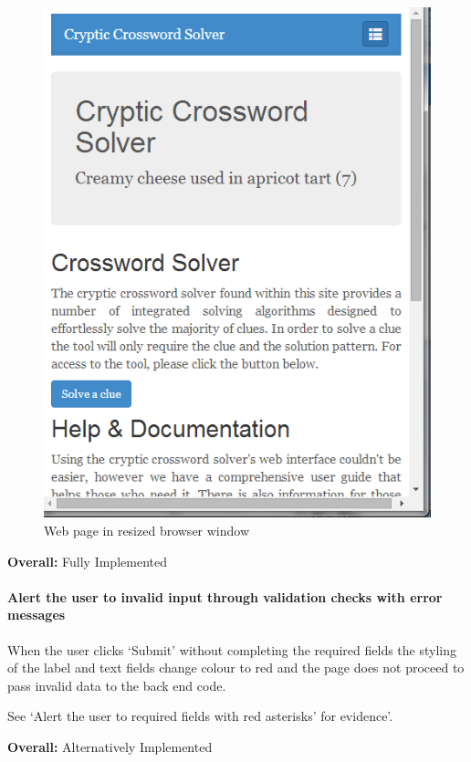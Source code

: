 \begin{figure}[H]
	\centering
	\includegraphics[keepaspectratio=true,scale=0.5]{evidence/scrolling1.png}
	\caption{Web page in resized browser window}
\end{figure}

{\bf Overall:} Fully Implemented


\paragraph{Alert the user to invalid input through validation checks with error
messages}
     
When the user clicks `Submit' without completing the required fields the
styling of the label and text fields change colour to red and the page does not
proceed to pass invalid data to the back end code.

See `Alert the user to required fields with red asterisks' for evidence'.

{\bf Overall:} Alternatively Implemented 


